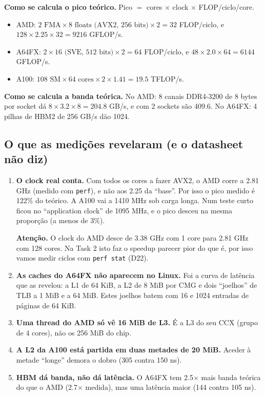 \documentclass[11pt,a4paper]{article}
\newcommand{\cuidado}[1]{\par\noindent\colorbox{orange!10}{\parbox{\dimexpr\linewidth-2\fboxsep}{\small\textbf{Atenção.} #1}}\par}
\begin{document}
\textbf{Como se calcula o pico teórico.} Pico $=$ cores $\times$ clock $\times$ FLOP/ciclo/core.
\begin{itemize}
\item AMD: $2\text{ FMA}\times 8\text{ floats (AVX2, 256 bits)}\times 2 = 32$ FLOP/ciclo, e
$128\times2.25\times32 = 9216$ GFLOP/s.
\item A64FX: $2\times16\text{ (SVE, 512 bits)}\times2 = 64$ FLOP/ciclo, e $48\times2.0\times64 = 6144$ GFLOP/s.
\item A100: $108\text{ SM}\times64\text{ cores}\times2\times1.41 = 19.5$ TFLOP/s.
\end{itemize}

\textbf{Como se calcula a banda teórica.} No AMD: 8 canais DDR4-3200 de 8 bytes por socket dá
$8\times3.2\times8 = 204.8$ GB/s, e com 2 sockets são 409.6. No A64FX: 4 pilhas de HBM2 de 256 GB/s
dão 1024.

\subsection{O que as medições revelaram (e o datasheet não diz)}
\begin{enumerate}
\item \textbf{O clock real conta.} Com todos os cores a fazer AVX2, o AMD corre a 2.81 GHz (medido com
\texttt{perf}), e não aos 2.25 da ``base''. Por isso o pico medido é 122\% do teórico. A A100 vai a
1410 MHz sob carga longa. Num teste curto ficou no ``application clock'' de 1095 MHz, e o pico desceu na
mesma proporção (a menos de 3\%).
\cuidado{O clock do AMD desce de 3.38 GHz com 1 core para 2.81 GHz com 128 cores. Na Task 2 isto faz o
speedup parecer pior do que é, por isso vamos medir ciclos com \texttt{perf stat} (D22).}
\item \textbf{As caches do A64FX não aparecem no Linux.} Foi a curva de latência que as revelou: a L1 de
64 KiB, a L2 de 8 MiB por CMG e dois ``joelhos'' de TLB a 1 MiB e a 64 MiB. Estes joelhos batem com
16 e 1024 entradas de páginas de 64 KiB.
\item \textbf{Uma thread do AMD só vê 16 MiB de L3.} É a L3 do seu CCX (grupo de 4 cores), não os
256 MiB do chip.
\item \textbf{A L2 da A100 está partida em duas metades de 20 MiB.} Aceder à metade ``longe'' demora o
dobro (305 contra 150 ns).
\item \textbf{HBM dá banda, não dá latência.} O A64FX tem 2.5$\times$ mais banda teórica do que o AMD (2.7$\times$ medida),
mas uma latência maior (144 contra 105 ns).
\end{enumerate}
\end{document}
